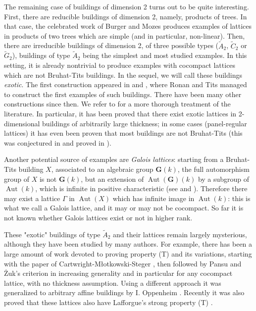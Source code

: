 \documentclass[a4paper, 11pt]{article}
\theoremstyle{plain}
\theoremstyle{definition}
\theoremstyle{remark}
\DeclareMathOperator{\Aut}{Aut}
\begin{document}
The remaining case of buildings of dimension 2 turns out to be quite interesting. First, there are reducible buildings of dimension 2, namely, products of trees. In that case, the celebrated work of Burger and Mozes \cite{BurgerMozes_lattices} produces examples of lattices in products of two trees which are simple (and in particular, non-linear). Then, there are irreducible buildings of dimension 2, of three possible types ($\tilde A_2$, $\tilde C_2$ or $\tilde G_2$), buildings of type $\tilde A_2$ being the simplest and most studied examples. 
In this setting, it is already nontrivial to produce examples with cocompact lattices which are not Bruhat-Tits buildings. In the sequel, we will call these buildings \emph{exotic}.
The first construction appeared in \cite{Ronan_triangle} and \cite{Tits_Andrews}, where Ronan and Tits managed to construct the first examples of such buildings. There have been many other constructions since then. We refer to \cite[\S1.3]{BCL} for a more thorough treatment of the literature. In particular, it has been proved that there exist exotic lattices in 2-dimensional buildings of arbitrarily large thickness; in some cases (panel-regular lattices) it has even been proven that most buildings are not Bruhat-Tits (this was conjectured in \cite{Witzel} and proved in \cite{Radu}). 

Another potential source of examples are \emph{Galois lattices}: starting from a Bruhat-Tits building $X$, associated to an algebraic group $\mathbf G(k)$, the full automorphism group of $X$ is not $\mathbf G(k)$, but an extension of $\Aut(\mathbf G)(k)$ by a subgroup of $\Aut(k)$, which is infinite in positive characteristic (see \cite{BorelTits} and \cite[Proposition 9.1]{BCL}). Therefore there may exist a lattice $\Gamma$ in $\Aut(X)$ which has infinite image in $\Aut(k)$: this is what we call a Galois lattice, and it may or may not be cocompact. So far it is not known whether Galois lattices exist or not in higher rank.

These "exotic" buildings of type $\tilde A_2$ and their lattices remain largely mysterious, although they have been studied by many authors. For example, there has been a large amount of work devoted to proving property (T) and its variations, starting with the paper of Cartwright-M\l otkowski-Steger \cite{CartMlotkT}, then followed by Pansu \cite{Pansu} and \.{Z}uk's criterion \cite{Zuk} in increasing generality and in particular for any cocompact lattice, with no thickness assumption. Using a different approach it was generalized to arbitrary affine buildings by I. Oppenheim \cite{oppenheim}. Recently it was also proved that these lattices also have Lafforgue's strong property (T) \cite{StrongT}. 
\end{document}
